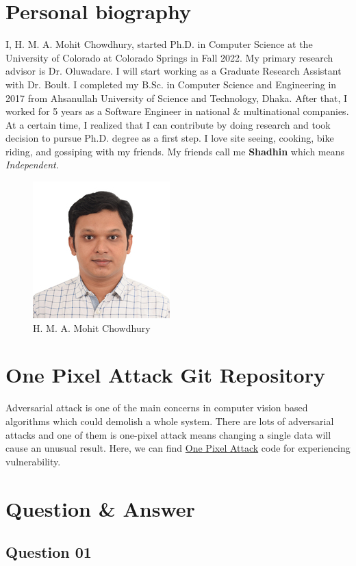 \documentclass[11pt, letterpaper]{article}
\begin{document}
\section{Personal biography}
I, H. M. A. Mohit Chowdhury, started Ph.D. in Computer Science at the University of Colorado at Colorado Springs in Fall 2022. My primary research advisor is Dr. Oluwadare. I will start working as a Graduate Research Assistant with Dr. Boult. I completed my B.Sc. in Computer Science and Engineering in 2017 from Ahsanullah University of Science and Technology, Dhaka. After that, I worked for 5 years as a Software Engineer in national \& multinational companies. At a certain time, I realized that I can contribute by doing research and took decision to pursue Ph.D. degree as a first step. I love site seeing, cooking, bike riding, and gossiping with my friends. My friends call me \textbf{Shadhin} which means \textit{Independent}.

\begin{figure}[H] \center
    \includegraphics[scale=1]{chowdhury.jpg}
    \caption{H. M. A. Mohit Chowdhury}
    \label{fig:chowdhury}
\end{figure}

\section{One Pixel Attack Git Repository}
Adversarial attack is one of the main concerns in computer vision based algorithms which could demolish a whole system. There are lots of adversarial attacks and one of them is one-pixel attack means changing a single data will cause an unusual result. Here, we can find \href{https://github.com/Hyperparticle/one-pixel-attack-keras}{One Pixel Attack} code for experiencing vulnerability.

\section{Question \& Answer}
\subsection{Question 01}
\end{document}
